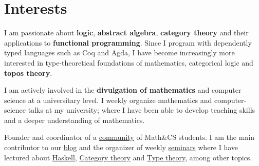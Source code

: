 \documentclass[nocolors]{friggeri-cv-a4}
\begin{document}
\section{Interests}

I am passionate about \textbf{logic}, \textbf{abstract algebra}, \textbf{category theory} and their
applications to \textbf{functional programming}. Since I program with dependently
typed languages such as Coq and Agda, I have become increasingly more interested
in type-theoretical foundations of mathematics, categorical
logic and \textbf{topos theory}.

I am actively involved in the \textbf{divulgation of mathematics} and computer
science at a universitary level. I weekly organize mathematics and
computer-science talks at my university; where I have been able to
develop teaching skills and a deeper understanding of mathematics.

\begin{entrylist}
{ Founder and coordinator of a \href{http://libreim.github.io/}{community} of Math\&CS students.
  I am the main contributor to our \href{http://libreim.github.io/blog/}{blog} and
  the organizer of weekly \href{http://libreim.github.io/dgiim/awesome/seminars/}{seminars} where I have lectured about
  \href{https://github.com/libreim/haskell}{Haskell},
  \href{https://github.com/libreim/introCategorias/blob/master/categorias.pdf}{Category theory}
  and \href{https://github.com/libreim/curryHoward/blob/master/CurryHoward.pdf}{Type theory},
  among other topics.
}

\end{entrylist}
\end{document}
